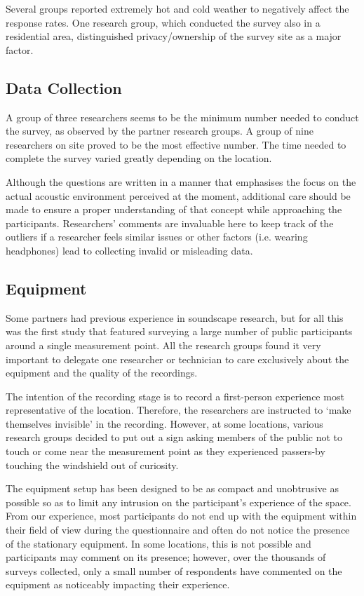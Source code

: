    Several groups reported extremely hot and cold weather to negatively affect the response rates. One research group, which conducted the survey also in a residential area, distinguished privacy/ownership of the survey site as a major factor.

 \subsection{Data Collection}

   A group of three researchers seems to be the minimum number needed to conduct the survey, as observed by the partner research groups. A group of nine researchers on site proved to be the most effective number. The time needed to complete the survey varied greatly depending on the location.

   Although the questions are written in a manner that emphasises the focus on the actual acoustic environment perceived at the moment, additional care should be made to ensure a proper understanding of that concept while approaching the participants. Researchers' comments are invaluable here to keep track of the outliers if a researcher feels similar issues or other factors (i.e. wearing headphones) lead to collecting invalid or misleading data.

 \subsection{Equipment}

   Some partners had previous experience in soundscape research, but for all this was the first study that featured surveying a large number of public participants around a single measurement point. All the research groups found it very important to delegate one researcher or technician to care exclusively about the equipment and the quality of the recordings.

   The intention of the recording stage is to record a first-person experience most representative of the location. Therefore, the researchers are instructed to `make themselves invisible' in the recording. However, at some locations, various research groups decided to put out a sign asking members of the public not to touch or come near the measurement point as they experienced passers-by touching the windshield out of curiosity.

   The equipment setup has been designed to be as compact and unobtrusive as possible so as to limit any intrusion on the participant's experience of the space. From our experience, most participants do not end up with the equipment within their field of view during the questionnaire and often do not notice the presence of the stationary equipment. In some locations, this is not possible and participants may comment on its presence; however, over the thousands of surveys collected, only a small number of respondents have commented on the equipment as noticeably impacting their experience.

